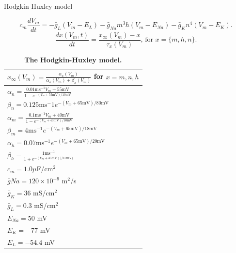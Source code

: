 \begin{floatingbox}[h]
\caption{Hodgkin-Huxley model}
\begin{equation}
c_m \frac{dV_m}{dt} = -\bar{g}_L(V_m-E_L) - \bar{g}_{Na} m^3 h (V_m - E_{Na}) - \bar{g}_{K} n^4 (V_m - E_{K}).
\label{Neuron:eq:HHfull}
\end{equation}
\begin{equation}
\frac{dx(V_m,t)}{dt} = \frac{x_{\infty}(V_m) - x}{\tau_x(V_m)},  \, \text{for } x = \{m,h,n\}.
\label{Neuron:eq:HHgates}
\end{equation}

\begin{table}[h!]
    \caption{\textbf{The Hodgkin-Huxley model.}}
    \label{Neuron:tab:HH}
\begin{center}
    \begin{tabular}{l}
    \hline
    $x_{\infty}(V_m) = \frac{\alpha_x(V_m)}{\alpha_x(V_m) + \beta_x(V_m)}$ for $x = m,n,h$ \\ \hline
    $ \alpha_n = \frac{0.01 \mathrm{ms}^{-1} V_m+55 \mathrm{mV}}{1-e^{-(V_m+55 \mathrm{mV})/10 \mathrm{mV}}}$  \\ \hline
    $ \beta_n = 0.125 \mathrm{ms}^-1 e^{-(V_m+65 \mathrm{mV})/80 \mathrm{mV}} $  \\ \hline
    $ \alpha_m = \frac{0.1 \mathrm{ms}^{-1} V_m+ 40 \mathrm{mV}} {1-e^{-(V_m+40 \mathrm{mV})/10 \mathrm{mV}}}$  \\ \hline
    $\beta_m = 4 \mathrm{ms}^{-1} e^{-(V_m+65  \mathrm{mV})/18 \mathrm{mV}} $  \\ \hline
    $\alpha_h = 0.07 \mathrm{ms}^{-1} e^{-(V_m+65 \mathrm{mV})/20 \mathrm{mV}}$  \\ \hline
    $\beta_h = \frac{1 \mathrm{ms}^{-1}}{1+e^{-(V_m+35 \mathrm{mV}))/10 \mathrm{mV})}} $  \\ \hline
    $c_m = 1.0 \mu $F/cm$^2$ \\ \hline
    $\bar{g}{Na} = 120\times 10^{-9}$ m$^2$/s\\ \hline
    $\bar{g}_{K} = 36$ mS/cm$^2$ \\ \hline
    $\bar{g}_{L} = 0.3$ mS/cm$^2$ \\ \hline
    $E_{Na} = 50$ mV \\ \hline
    $E_{K} = -77$ mV \\ \hline
    $E_{L} = -54.4$ mV \\ \hline
    \end{tabular}
    \end{center}
\end{table}


\end{floatingbox}
